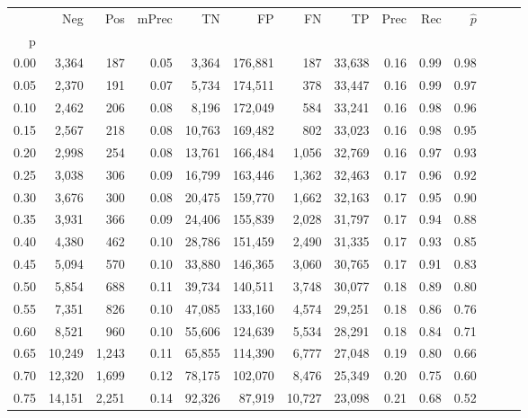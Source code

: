 \begin{tabular}{rrrrrrrrrrrrrr}
\toprule
{} &     Neg &    Pos & mPrec &       TN &       FP &      FN &      TP &  Prec &   Rec & $\hat{p}$ \\
p    &         &        &       &          &          &         &         &       &       &           \\
\midrule
0.00 &   3,364 &    187 &  0.05 &    3,364 &  176,881 &     187 &  33,638 &  0.16 &  0.99 &      0.98 \\
0.05 &   2,370 &    191 &  0.07 &    5,734 &  174,511 &     378 &  33,447 &  0.16 &  0.99 &      0.97 \\
0.10 &   2,462 &    206 &  0.08 &    8,196 &  172,049 &     584 &  33,241 &  0.16 &  0.98 &      0.96 \\
0.15 &   2,567 &    218 &  0.08 &   10,763 &  169,482 &     802 &  33,023 &  0.16 &  0.98 &      0.95 \\
0.20 &   2,998 &    254 &  0.08 &   13,761 &  166,484 &   1,056 &  32,769 &  0.16 &  0.97 &      0.93 \\
0.25 &   3,038 &    306 &  0.09 &   16,799 &  163,446 &   1,362 &  32,463 &  0.17 &  0.96 &      0.92 \\
0.30 &   3,676 &    300 &  0.08 &   20,475 &  159,770 &   1,662 &  32,163 &  0.17 &  0.95 &      0.90 \\
0.35 &   3,931 &    366 &  0.09 &   24,406 &  155,839 &   2,028 &  31,797 &  0.17 &  0.94 &      0.88 \\
0.40 &   4,380 &    462 &  0.10 &   28,786 &  151,459 &   2,490 &  31,335 &  0.17 &  0.93 &      0.85 \\
0.45 &   5,094 &    570 &  0.10 &   33,880 &  146,365 &   3,060 &  30,765 &  0.17 &  0.91 &      0.83 \\
0.50 &   5,854 &    688 &  0.11 &   39,734 &  140,511 &   3,748 &  30,077 &  0.18 &  0.89 &      0.80 \\
0.55 &   7,351 &    826 &  0.10 &   47,085 &  133,160 &   4,574 &  29,251 &  0.18 &  0.86 &      0.76 \\
0.60 &   8,521 &    960 &  0.10 &   55,606 &  124,639 &   5,534 &  28,291 &  0.18 &  0.84 &      0.71 \\
0.65 &  10,249 &  1,243 &  0.11 &   65,855 &  114,390 &   6,777 &  27,048 &  0.19 &  0.80 &      0.66 \\
0.70 &  12,320 &  1,699 &  0.12 &   78,175 &  102,070 &   8,476 &  25,349 &  0.20 &  0.75 &      0.60 \\
0.75 &  14,151 &  2,251 &  0.14 &   92,326 &   87,919 &  10,727 &  23,098 &  0.21 &  0.68 &      0.52 \\

\end{tabular}
